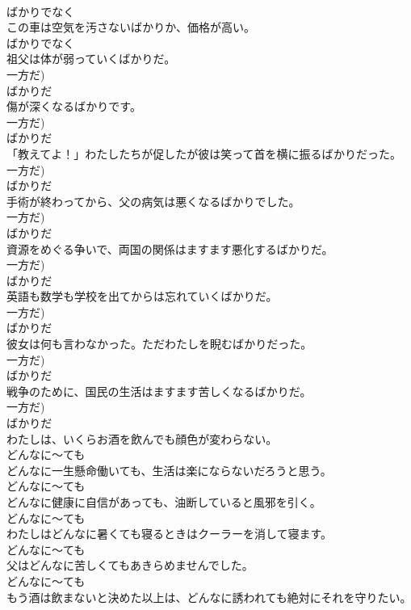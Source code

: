 \documentclass[8pt]{extreport}
\begin{document}
\begin{CJK}{UTF8}{min}
\\	ばかりでなく	
\\	この車は空気を汚さないばかりか、価格が高い。	
\\	ばかりでなく	
\\	祖父は体が弱っていくばかりだ。	
\\	一方だ)	
\\	ばかりだ	
\\	傷が深くなるばかりです。	
\\	一方だ)	
\\	ばかりだ	
\\	「教えてよ！」わたしたちが促したが彼は笑って首を横に振るばかりだった。	
\\	一方だ)	
\\	ばかりだ	
\\	手術が終わってから、父の病気は悪くなるばかりでした。	
\\	一方だ)	
\\	ばかりだ	
\\	資源をめぐる争いで、両国の関係はますます悪化するばかりだ。	
\\	一方だ)	
\\	ばかりだ	
\\	英語も数学も学校を出てからは忘れていくばかりだ。	
\\	一方だ)	
\\	ばかりだ	
\\	彼女は何も言わなかった。ただわたしを睨むばかりだった。	
\\	一方だ)	
\\	ばかりだ	
\\	戦争のために、国民の生活はますます苦しくなるばかりだ。	
\\	一方だ)	
\\	ばかりだ	
\\	わたしは、いくらお酒を飲んでも顔色が変わらない。	
\\	どんなに～ても	
\\	どんなに一生懸命働いても、生活は楽にならないだろうと思う。	
\\	どんなに～ても	
\\	どんなに健康に自信があっても、油断していると風邪を引く。	
\\	どんなに～ても	
\\	わたしはどんなに暑くても寝るときはクーラーを消して寝ます。	
\\	どんなに～ても	
\\	父はどんなに苦しくてもあきらめませんでした。	
\\	どんなに～ても	
\\	もう酒は飲まないと決めた以上は、どんなに誘われても絶対にそれを守りたい。	

\end{CJK}
\end{document}
